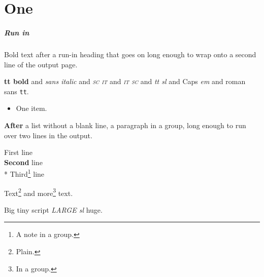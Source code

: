\documentclass[11pt]{report}
\begin{document}
\chapter{One}
\paragraph{Run in} Bold text after a run-in heading that goes on long enough to wrap onto a second line of the output page.

{\ttfamily\bfseries tt bold} and {\sffamily\itshape sans italic} and {\scshape\itshape sc it} and {\itshape\scshape it sc}
and {\ttfamily\slshape tt sl} and {\sc Caps \em em} and {\rm roman \sf sans \tt tt}.

\begin{itemize}
\item One item.
\end{itemize}
{\bfseries After} a list without a blank line, a paragraph in a group, long enough to run over two lines in the output.

\begin{flushright}
First line\\
{\large\bfseries Second} line\\*
{\footnotesize Third\footnote{A note in a group.}} line
\end{flushright}

Text\footnote{Plain.} and {\small more\footnote{In a group.}} text.

{\Huge Big} {\tiny tiny} {\scriptsize script} {\LARGE\sl LARGE sl} {\huge huge}.
\end{document}
